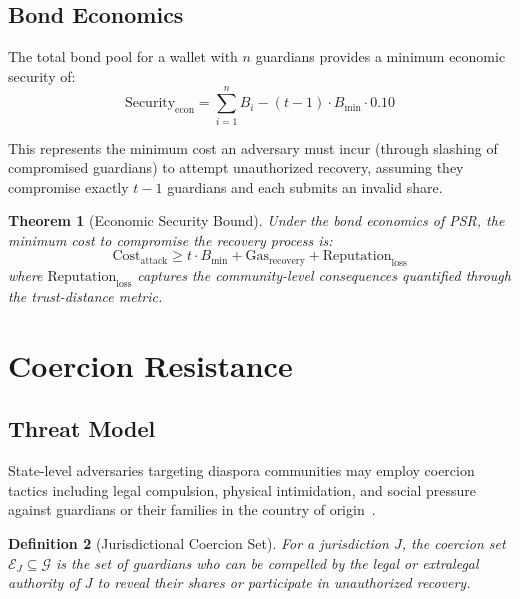 \documentclass[11pt,a4paper,twocolumn]{article}
\newtheorem{theorem}{Theorem}[section]
\newtheorem{definition}[theorem]{Definition}
\begin{document}
\subsection{Bond Economics}

The total bond pool for a wallet with $n$ guardians provides a minimum economic security of:
\begin{equation}
  \text{Security}_{\text{econ}} = \sum_{i=1}^{n} B_i - (t-1) \cdot B_{\min} \cdot 0.10
\end{equation}

This represents the minimum cost an adversary must incur (through slashing of compromised guardians) to attempt unauthorized recovery, assuming they compromise exactly $t-1$ guardians and each submits an invalid share.

\begin{theorem}[Economic Security Bound]
Under the bond economics of PSR, the minimum cost to compromise the recovery process is:
\begin{equation}
  \text{Cost}_{\text{attack}} \geq t \cdot B_{\min} + \text{Gas}_{\text{recovery}} + \text{Reputation}_{\text{loss}}
\end{equation}
where $\text{Reputation}_{\text{loss}}$ captures the community-level consequences quantified through the trust-distance metric.
\end{theorem}

\section{Coercion Resistance}\label{sec:coercion}

\subsection{Threat Model}

State-level adversaries targeting diaspora communities may employ coercion tactics including legal compulsion, physical intimidation, and social pressure against guardians or their families in the country of origin~\cite{amnesty2023iran,hrw2022surveillance}.

\begin{definition}[Jurisdictional Coercion Set]
For a jurisdiction $J$, the coercion set $\mathcal{E}_J \subseteq \mathcal{G}$ is the set of guardians who can be compelled by the legal or extralegal authority of $J$ to reveal their shares or participate in unauthorized recovery.
\end{definition}
\end{document}
